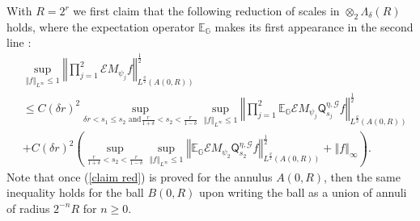\documentclass{amsart}%
\theoremstyle{plain}
\numberwithin{equation}{section}
\begin{document}
With $R=2^{r}$ we first claim that the following reduction of scales in
$\otimes_{2}\Lambda_{\delta}\left(  R\right)  $ holds, where the expectation
operator $\mathbb{E}_{\mathbb{G}}$ makes its first appearance in the second
line :%
\begin{align}
& \sup_{\left\Vert f\right\Vert _{L^{\infty}}\leq1}\left\Vert \prod_{j=1}%
^{2}\mathcal{E}M_{\psi_{j}}f\right\Vert _{L^{\frac{q}{2}}\left(  A\left(
0,R\right)  \right)  }^{\frac{1}{2}}\label{claim red}\\
& \leq C\left(  \delta r\right)  ^{2}\sup_{\delta r<s_{1}\leq s_{2}\text{ and
}\frac{r}{1+\delta}<s_{2}<\frac{r}{1-\delta}}\sup_{\left\Vert f\right\Vert
_{L^{\infty}}\leq1}\left\Vert \prod_{j=1}^{2}\mathbb{E}_{\mathbb{G}%
}\mathcal{E}M_{\psi_{j}}\mathsf{Q}_{s_{j}}^{\eta,\mathcal{G}}f\right\Vert
_{L^{\frac{q}{2}}\left(  A\left(  0,R\right)  \right)  }^{\frac{1}{2}%
}\nonumber\\
& +C\left(  \delta r\right)  ^{2}\left(  \sup_{\frac{r}{1+\delta}<s_{2}%
<\frac{r}{1-\delta}}\sup_{\left\Vert f\right\Vert _{L^{\infty}}\leq
1}\left\Vert \mathbb{E}_{\mathbb{G}}\mathcal{E}M_{\psi_{2}}\mathsf{Q}_{s_{2}%
}^{\eta,\mathcal{G}}f\right\Vert _{L^{\frac{q}{2}}\left(  A\left(  0,R\right)
\right)  }^{\frac{1}{2}}+\left\Vert f\right\Vert _{\infty}\right)  .\nonumber
\end{align}
Note that once (\ref{claim red}) is proved for the annulus $A\left(
0,R\right)  $, then the same inequality holds for the ball $B\left(
0,R\right)  $ upon writing the ball as a union of annuli of radius $2^{-n}R$
for $n\geq0$.
\end{document}
